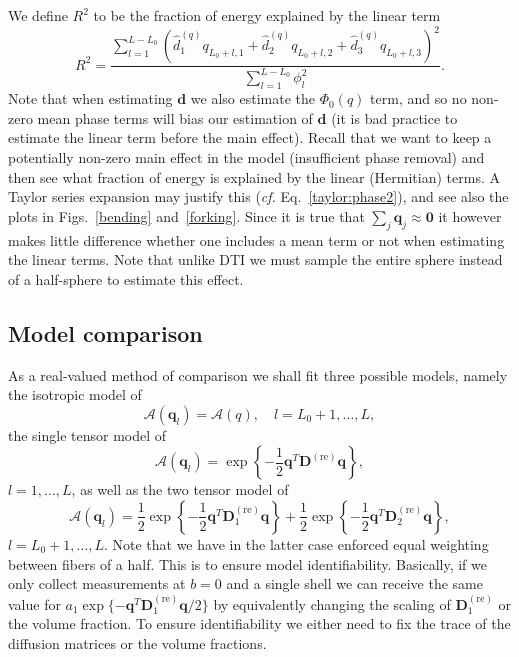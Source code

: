 \documentclass[authoryear,preprint,12pt]{elsarticle}
\newcommand{\re}{\text{re}}
\newcommand{\bq}{\mathbf{q}}
\newcommand{\bD}{\mathbf{D}}
\newcommand{\q}{\mathbf{q}}
\newcommand{\cA}{\mathcal{A}}
\newcommand{\bld}[1]{\mathbf{#1}}
\begin{document}
We define $R^2$ to be the fraction of energy explained by the linear
term
\begin{equation}
  R^2 = \frac{\sum_{l=1}^{L-L_0} \left(\hat{d}_1^{(q)}q_{L_0+l,1}
    + \hat{d}_2^{(q)}q_{L_0+l,2} + \hat{d}_3^{(q)}q_{L_0+l,3}\right)^2}
  {\sum_{l=1}^{L-L_0}\phi_l^2}.
\end{equation}
Note that when estimating $\bld{d}$ we also estimate the $\Phi_0(q)$
term, and so no non-zero mean phase terms will bias our estimation of
$\bld{d}$ (it is bad practice to estimate the linear term before the
main effect).  Recall that we want to keep a potentially non-zero main
effect in the model (insufficient phase removal) and then see what
fraction of energy is explained by the linear (Hermitian) terms.  A
Taylor series expansion may justify this (\textit{cf.}
Eq.~\eqref{taylor:phase2}), and see also the plots in
Figs.~\ref{bending} and~\ref{forking}.  Since it is true that
$\sum_j\q_j\approx\bld{0}$ it however makes little difference whether
one includes a mean term or not when estimating the linear terms.
Note that unlike DTI we must sample the entire sphere instead of a
half-sphere to estimate this effect.

\subsection{Model comparison}

As a real-valued method of comparison we shall fit three possible
models, namely the isotropic model of
\begin{equation}\label{isotropic}
  \cA(\bq_l) = \cA(q), \quad l=L_0+1, \dots, L,
\end{equation}
the single tensor model of
\begin{equation}\label{singletensor}
  \cA(\bq_l) = \exp\left\{-\frac{1}{2}\q^T\bD^{(\re)}\q\right\}, 
\end{equation}
$l=1,\dots,L$, as well as the two tensor model of 
\begin{equation}\label{doubletensor}
  \cA(\bq_l) = \frac{1}{2}\exp\left\{-\frac{1}{2} \q^T \bD^{(\re)}_1
  \q\right\} + \frac{1}{2}\exp\left\{-\frac{1}{2} \q^T \bD^{(\re)}_2
  \q\right\},
\end{equation}
$l=L_0+1,\dots,L$.  Note that we have in the latter case enforced
equal weighting between fibers of a half.  This is to ensure model
identifiability.  Basically, if we only collect measurements at $b=0$
and a single shell we can receive the same value for
$a_1\exp\{-{\q}^T\bD^{(\re)}_1{\q}/2\}$ by equivalently changing the
scaling of $\bD^{(\re)}_1$ or the volume fraction.  To ensure
identifiability we either need to fix the trace of the diffusion
matrices or the volume fractions.
\end{document}
